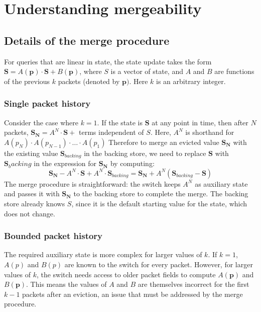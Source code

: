 
\chapter{Understanding mergeability}
\label{app:merge}

\section{Details of the merge procedure}

For queries that are linear in state, the state update takes the form $\mathbf{S} = A(\mathbf{p})\cdot\mathbf{S} + B(\mathbf{p})$, where $S$ is a vector of state, and $A$ and $B$ are functions of the previous $k$ packets (denoted by $\mathbf{p})$. Here $k$ is an arbitrary integer.

\subsection{Single packet history}

Consider the case where $k = 1$. If the state is $\mathbf{S}$ at any point in time, then after $N$ packets,
$\mathbf{S_N} = A^N\cdot \mathbf{S} + $ terms independent of $S$. Here, $A^N$ is shorthand for $A(p_N)\cdot A(p_{N-1}) \cdot \ldots \cdot A(p_1)$
Therefore to merge an evicted value $\mathbf{S_N}$ with the existing value $\mathbf{S}_{backing}$ in the backing store,
we need to replace $\mathbf{S}$ with $\mathbf{S}_backing$ in the expression for $\mathbf{S_N}$ by computing:
\[ \mathbf{S_N} - A^N \cdot \mathbf{S} + A^N \cdot \mathbf{S}_{backing} = \mathbf{S_N} + A^N(\mathbf{S}_{backing} - \mathbf{S}) \]
The merge procedure is straightforward: the switch keeps $A^N$ as auxiliary state and passes it with $\mathbf{S_N}$ to the backing store to complete the merge.
The backing store already knows $S$, since it is the default starting value for the state, which does not change.

\subsection{Bounded packet history}

The required auxiliary state is more complex for larger values of $k$. If $k = 1$, $A(p)$ and $B(p)$ are known to the switch for every packet. However, for larger values of $k$, the switch needs access to older packet fields to compute $A(\mathbf{p})$ and $B(\mathbf{p})$. This means the values of $A$ and $B$ are themselves incorrect for the first $k-1$ packets after an eviction, an issue that must be addressed by the merge procedure.


